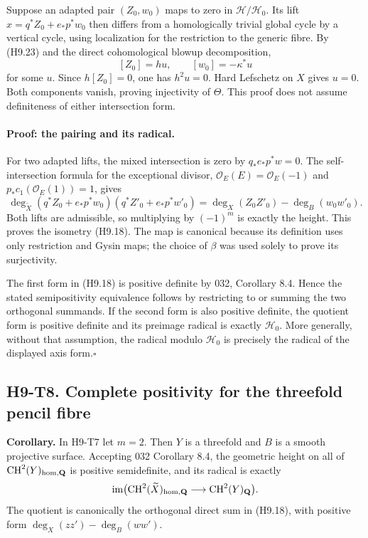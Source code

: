 Suppose an adapted pair $(Z_0,w_0)$ maps to zero in
$\mathcal H/\mathcal H_0$. Its lift
$x=q^*Z_0+e_*p^*w_0$ then differs from a homologically trivial global
cycle by a vertical cycle, using localization for the restriction to
the generic fibre. By (H9.23) and the direct cohomological blowup
decomposition,
\[
 [Z_0]=h u,\qquad [w_0]=-\kappa^*u
\]
for some $u$. Since $h[Z_0]=0$, one has $h^2u=0$.
Hard Lefschetz on $X$ gives $u=0$. Both components vanish, proving
injectivity of $\Theta$. This proof does not assume definiteness of
either intersection form.

\paragraph{Proof: the pairing and its radical.}
For two adapted lifts, the mixed intersection is zero by
$q_*e_*p^*w=0$. The self-intersection formula for the exceptional
divisor, $\mathcal O_E(E)=\mathcal O_E(-1)$ and
$p_*c_1(\mathcal O_E(1))=1$, gives
\[
 \deg_{\widetilde X}
  (q^*Z_0+e_*p^*w_0)(q^*Z'_0+e_*p^*w'_0)
   =\deg_X(Z_0Z'_0)-\deg_B(w_0w'_0).                          \tag{H9.24}
\]
Both lifts are admissible, so multiplying by $(-1)^m$ is exactly the
height. This proves the isometry (H9.18). The map is canonical because
its definition uses only restriction and Gysin maps; the choice of
$\beta$ was used solely to prove its surjectivity.

The first form in (H9.18) is positive definite by 032, Corollary 8.4.
Hence the stated semipositivity equivalence follows by restricting to
or summing the two orthogonal summands. If the second form is also
positive definite, the quotient form is positive definite and its
preimage radical is exactly $\mathcal H_0$. More generally, without
that assumption, the radical modulo $\mathcal H_0$ is precisely the
radical of the displayed axis form.\hfill$\square$

\subsection*{H9-T8. Complete positivity for the threefold pencil fibre}

\textbf{Corollary.} In H9-T7 let $m=2$. Then $Y$ is a threefold and
$B$ is a smooth projective surface. Accepting 032 Corollary 8.4, the
geometric height on all of $\operatorname{CH}^2(Y)_{\rm hom,\mathbf Q}$
is positive semidefinite, and its radical is exactly
\[
 \operatorname{im}\bigl(\operatorname{CH}^2(\widetilde X)_{
       \rm hom,\mathbf Q}\longrightarrow
       \operatorname{CH}^2(Y)_{\mathbf Q}\bigr).
\]
The quotient is canonically the orthogonal direct sum in (H9.18), with
positive form $\deg_X(zz')-\deg_B(ww')$.

